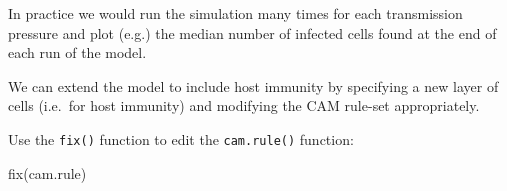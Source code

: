\documentclass[
  12pt,
  a4paper]{book}
\newenvironment{Shaded}{\begin{snugshade}}{\end{snugshade}}
\newcommand{\AttributeTok}[1]{\textcolor[rgb]{0.77,0.63,0.00}{#1}}
\newcommand{\ControlFlowTok}[1]{\textcolor[rgb]{0.13,0.29,0.53}{\textbf{#1}}}
\newcommand{\DecValTok}[1]{\textcolor[rgb]{0.00,0.00,0.81}{#1}}
\newcommand{\FloatTok}[1]{\textcolor[rgb]{0.00,0.00,0.81}{#1}}
\newcommand{\FunctionTok}[1]{\textcolor[rgb]{0.00,0.00,0.00}{#1}}
\newcommand{\NormalTok}[1]{#1}
\newcommand{\OtherTok}[1]{\textcolor[rgb]{0.56,0.35,0.01}{#1}}
\newcommand{\SpecialCharTok}[1]{\textcolor[rgb]{0.00,0.00,0.00}{#1}}
\newcommand{\StringTok}[1]{\textcolor[rgb]{0.31,0.60,0.02}{#1}}
\begin{document}
\begin{Shaded}
\end{Shaded}

In practice we would run the simulation many times for each transmission pressure and plot (e.g.) the median number of infected cells found at the end of each run of the model.

We can extend the model to include host immunity by specifying a new layer of cells (i.e.~for host immunity) and modifying the CAM rule-set appropriately.

Use the \texttt{fix()} function to edit the \texttt{cam.rule()} function:

\begin{Shaded}
\begin{Highlighting}[]
\FunctionTok{fix}\NormalTok{(cam.rule)}
\end{Highlighting}
\end{Shaded}
\end{document}
